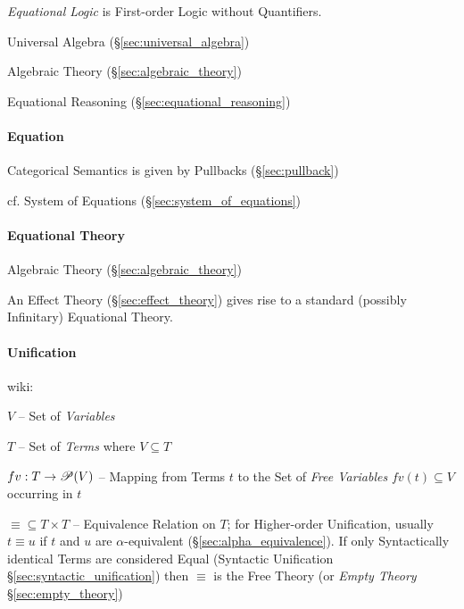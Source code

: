 \emph{Equational Logic} is First-order Logic without Quantifiers.

Universal Algebra (\S\ref{sec:universal_algebra})

Algebraic Theory (\S\ref{sec:algebraic_theory})

Equational Reasoning (\S\ref{sec:equational_reasoning})



\paragraph{Equation}\label{sec:equation}\hfill


Categorical Semantics is given by Pullbacks (\S\ref{sec:pullback})

\fist cf. System of Equations (\S\ref{sec:system_of_equations})



\paragraph{Equational Theory}\label{sec:equational_theory}\hfill

Algebraic Theory (\S\ref{sec:algebraic_theory})

An Effect Theory (\S\ref{sec:effect_theory}) gives rise to a standard
(possibly Infinitary) Equational Theory. \cite{plotkin-pretnar09}



\paragraph{Unification}\label{sec:unification}\hfill

wiki:

$V$ -- Set of \emph{Variables}

$T$ -- Set of \emph{Terms} where $V \subseteq T$

$fv : T \rightarrow \mathscr{P}(V)$ -- Mapping from Terms $t$ to the Set of
\emph{Free Variables} $fv(t) \subseteq V$ occurring in $t$

$\equiv \subseteq T \times T$ -- Equivalence Relation on $T$; for
Higher-order Unification, usually $t \equiv u$ if $t$ and $u$ are
$\alpha$-equivalent (\S\ref{sec:alpha_equivalence}). If only
Syntactically identical Terms are considered Equal (Syntactic
Unification \S\ref{sec:syntactic_unification}) then $\equiv$ is the
Free Theory (or \emph{Empty Theory} \S\ref{sec:empty_theory})


